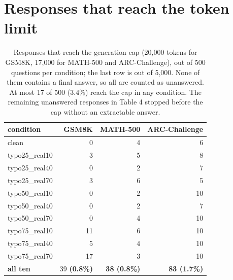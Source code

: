 \documentclass[11pt]{article}
\begin{document}
\section{Responses that reach the token limit}
\begin{table}[H]
\centering
\small
\begin{tabular}{lrrr}
\toprule
\textbf{condition} & \textbf{GSM8K} & \textbf{MATH-500} & \textbf{ARC-Challenge} \\
\midrule
clean & 0 & 4 & 6 \\
typo25\_real10 & 3 & 5 & 8 \\
typo25\_real40 & 0 & 2 & 7 \\
typo25\_real70 & 3 & 6 & 5 \\
typo50\_real10 & 0 & 2 & 10 \\
typo50\_real40 & 0 & 2 & 7 \\
typo50\_real70 & 0 & 4 & 10 \\
typo75\_real10 & 11 & 6 & 10 \\
typo75\_real40 & 5 & 4 & 10 \\
typo75\_real70 & 17 & 3 & 10 \\
\midrule
\textbf{all ten} & 39 \textbf{(0.8\%)} & \textbf{38 (0.8\%)} & \textbf{83 (1.7\%)} \\
\bottomrule
\end{tabular}
\caption{Responses that reach the generation cap (20,000 tokens for GSM8K, 17,000 for MATH-500 and ARC-Challenge), out of 500 questions per condition; the last row is out of 5,000. None of them contains a final answer, so all are counted as unanswered. At most 17 of 500 (3.4\%) reach the cap in any condition. The remaining unanswered responses in Table 4 stopped before the cap without an extractable answer.}
\label{tab:9}
\end{table}
\end{document}
